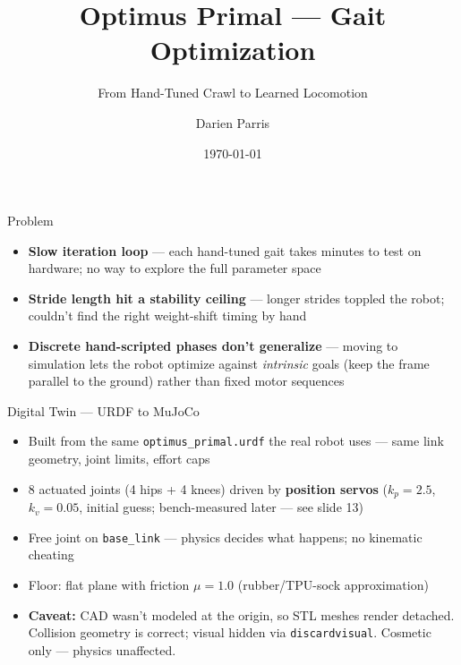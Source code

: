 \documentclass[aspectratio=169]{beamer}
\title{Optimus Primal --- Gait Optimization}
\subtitle{From Hand-Tuned Crawl to Learned Locomotion}
\author{Darien Parris}
\date{\today}
\begin{document}
\begin{frame}
\titlepage
\end{frame}

\begin{frame}{Problem}
\begin{itemize}
    \item \textbf{Slow iteration loop} --- each hand-tuned gait takes minutes to test on hardware; no way to explore the full parameter space
    \item \textbf{Stride length hit a stability ceiling} --- longer strides toppled the robot; couldn't find the right weight-shift timing by hand
    \item \textbf{Discrete hand-scripted phases don't generalize} --- moving to simulation lets the robot optimize against \emph{intrinsic} goals (keep the frame parallel to the ground) rather than fixed motor sequences
\end{itemize}
\end{frame}

\begin{frame}{Digital Twin --- URDF to MuJoCo}
\begin{itemize}
    \item Built from the same \texttt{optimus\_primal.urdf} the real robot uses --- same link geometry, joint limits, effort caps
    \item 8 actuated joints (4 hips + 4 knees) driven by \textbf{position servos} ($k_p{=}2.5$, $k_v{=}0.05$, initial guess; bench-measured later --- see slide 13)
    \item Free joint on \texttt{base\_link} --- physics decides what happens; no kinematic cheating
    \item Floor: flat plane with friction $\mu{=}1.0$ (rubber/TPU-sock approximation)
    \item \textbf{Caveat:} CAD wasn't modeled at the origin, so STL meshes render detached. Collision geometry is correct; visual hidden via \texttt{discardvisual}. Cosmetic only --- physics unaffected.
\end{itemize}
\end{frame}
\end{document}
